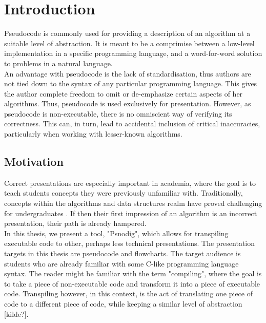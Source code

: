 \chapter{Introduction}

Pseudocode is commonly used for providing a description of an algorithm at a suitable level of abstraction. It is meant to be a comprimise between a low-level implementation in a specific programming language, and a word-for-word solution to problems in a natural language. \hfill \\


An advantage with pseudocode is the lack of standardisation, thus authors are not tied down to the syntax of any particular programming language. This gives the author complete freedom to omit or de-emphasize certain aspects of her algorithms. Thus, pseudocode is used exclusively for presentation. However, as pseudocode is non-executable, there is no omniscient way of verifying its correctness. This can, in turn, lead to accidental inclusion of critical inaccuracies, particularly when working with lesser-known algorithms. \hfill \\

\section{Motivation}

Correct presentations are especially important in academia, where the goal is to teach students concepts they were previously unfamiliar with. Traditionally, concepts within the algorithms and data structures realm have proved challenging for undergraduates \cite{10.1145/2157136.2157148}. If then their first impression of an algorithm is an incorrect presentation, their path is already hampered. \hfill \\

In this thesis, we present a tool, "Psnodig", which allows for transpiling executable code to other, perhaps less technical presentations. The presentation targets in this thesis are pseudocode and flowcharts. The target audience is students who are already familiar with some C-like programming language syntax. The reader might be familiar with the term "compiling", where the goal is to take a piece of non-executable code and transform it into a piece of executable code. Transpiling however, in this context, is the act of translating one piece of code to a different piece of code, while keeping a similar level of abstraction [kilde?]. \hfill \\

